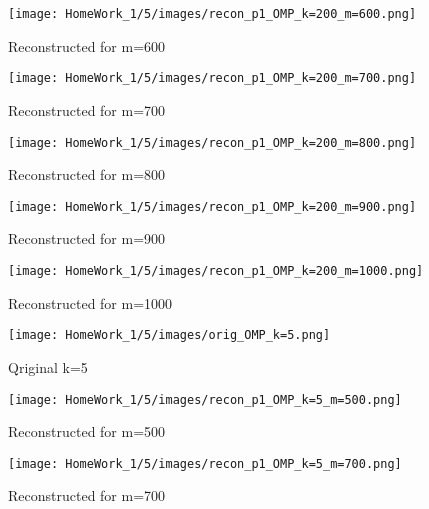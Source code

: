 \documentclass{article}
\begin{document}
\begin{figure}[h!]
    \begin{minipage}{0.1\textwidth}
        \centering
        \texttt{[image: HomeWork\_1/5/images/recon\_p1\_OMP\_k=200\_m=600.png]}
        \caption{Reconstructed for m=600}
    \end{minipage}
    \hspace{0.5cm}
    \begin{minipage}{0.1\textwidth}
        \centering
        \texttt{[image: HomeWork\_1/5/images/recon\_p1\_OMP\_k=200\_m=700.png]}
        \caption{Reconstructed for m=700}
    \end{minipage}
    \hspace{0.5cm}
    \begin{minipage}{0.1\textwidth}
        \centering
        \texttt{[image: HomeWork\_1/5/images/recon\_p1\_OMP\_k=200\_m=800.png]}
        \caption{\small Reconstructed for m=800}
    \end{minipage}
    \hspace{0.5cm}
    \begin{minipage}{0.1\textwidth}
        \centering
        \texttt{[image: HomeWork\_1/5/images/recon\_p1\_OMP\_k=200\_m=900.png]}
        \caption{Reconstructed for m=900}
    \end{minipage}
    \hspace{0.5cm}
    \begin{minipage}{0.1\textwidth}
        \centering
        \texttt{[image: HomeWork\_1/5/images/recon\_p1\_OMP\_k=200\_m=1000.png]}
        \caption{Reconstructed for m=1000}
    \end{minipage}
\end{figure}

\begin{figure}[h!]
    \centering
    \begin{minipage}{0.1\textwidth}
        \texttt{[image: HomeWork\_1/5/images/orig\_OMP\_k=5.png]}
        \caption{Qriginal k=5}
    \end{minipage}
    \hspace{0.5cm}
    \begin{minipage}{0.1\textwidth}
        \centering
        \texttt{[image: HomeWork\_1/5/images/recon\_p1\_OMP\_k=5\_m=500.png]}
        \caption{Reconstructed for m=500}
    \end{minipage}
    \hspace{0.5cm}
    \begin{minipage}{0.1\textwidth}
        \centering
        \texttt{[image: HomeWork\_1/5/images/recon\_p1\_OMP\_k=5\_m=700.png]}
        \caption{Reconstructed for m=700}
    \end{minipage}
\end{figure}
\end{document}
